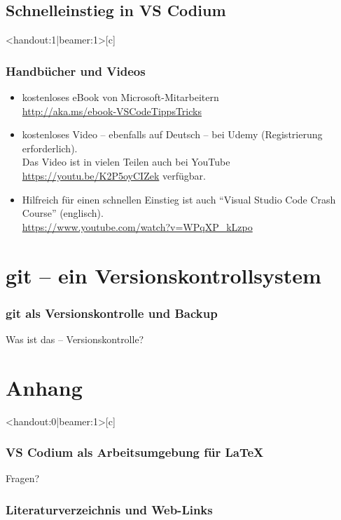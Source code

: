 \documentclass[t, %
							xcolor=dvipsnames,%
							hyperref={bookmarks,colorlinks},%
							]%
							{beamer}
\begin{document}
		\subsection{Schnelleinstieg in VS Codium}
			\label{sub:SchnelleinstiegVSCodium}
			\begin{frame}<handout:1|beamer:1>[c]
				\frametitle{Handbücher und Videos}
				\begin{itemize}
					\item kostenloses eBook von Microsoft-Mitarbeitern \cite{MSeBook}\\\url{http://aka.ms/ebook-VSCodeTippsTricks}
					\item kostenloses Video -- ebenfalls auf Deutsch -- bei Udemy \cite{VSCode-udemy} (Registrierung erforderlich).\\Das Video ist in vielen Teilen auch bei YouTube \\\url{https://youtu.be/K2P5oyCIZek} verfügbar.
					\item Hilfreich für einen schnellen Einstieg ist auch \enquote{Visual Studio Code Crash Course}  (englisch).\cite{crashcourse}\\\url{https://www.youtube.com/watch?v=WPqXP_kLzpo}
				\end{itemize}
			\end{frame}
	
	\section{git – ein Versionskontrollsystem}
	\label{sec:git-vcs}
	\begin{frame}
		\frametitle{git als Versionskontrolle und Backup}
		Was ist das – Versionskontrolle?
	\end{frame}

	
	
	
	
%

\section{Anhang}
	\label{sec:Anhang}
	\begin{frame}<handout:0|beamer:1>[c]
		\frametitle{VS Codium als Arbeitsumgebung für \LaTeX}
		\centering
		\Huge{Fragen?}
	\end{frame}

	\begin{frame}[allowframebreaks]
		\frametitle{Literaturverzeichnis und Web-Links}
		\printbibliography
\end{frame}

\end{document}
